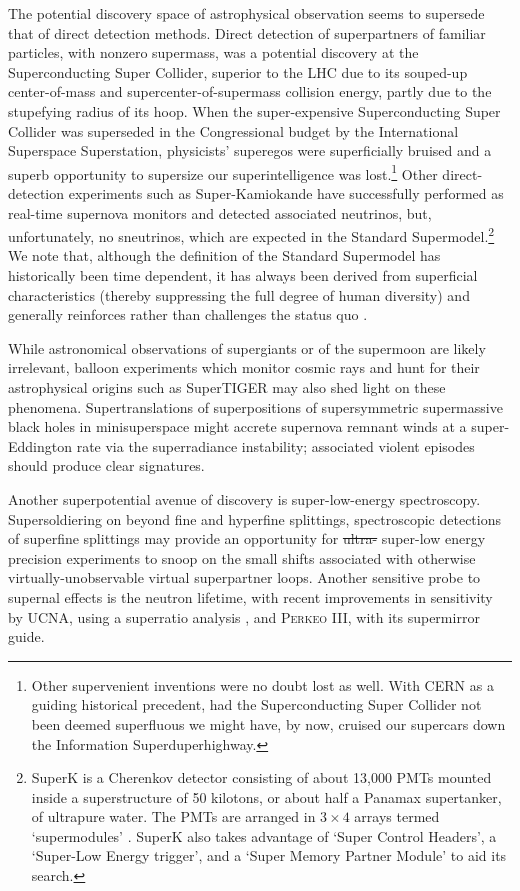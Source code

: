 The potential discovery space of astrophysical observation seems to supersede that of direct detection methods. 
Direct detection of superpartners of familiar particles, with nonzero supermass, was a potential discovery at the Superconducting Super Collider, superior to the LHC due to its souped-up center-of-mass and supercenter-of-supermass collision energy, partly due to the stupefying radius of its hoop.
When the super-expensive Superconducting Super Collider was superseded in the Congressional budget by the International Superspace Superstation, physicists' superegos were superficially bruised and a superb opportunity to supersize our superintelligence was lost.\footnote{Other supervenient inventions were no doubt lost as well.
With CERN as a guiding historical precedent, had the Superconducting Super Collider not been deemed superfluous we might have, by now, cruised our supercars down the Information Superduperhighway.}
Other direct-detection experiments such as Super-Kamiokande have successfully performed as real-time supernova monitors and detected associated neutrinos, but, unfortunately, no sneutrinos, which are expected in the Standard Supermodel.\footnote{SuperK is a Cherenkov detector consisting of about 13,000 PMTs mounted inside a superstructure of 50 kilotons, or about half a Panamax supertanker, of ultrapure water.  The PMTs are arranged in $3\times4$ arrays termed `supermodules' \cite{Fukuda:2002uc}.
SuperK also takes advantage of `Super Control Headers', a `Super-Low Energy trigger', and a `Super Memory Partner Module' to aid its search.
} We note that, although the definition of the Standard Supermodel has historically been time dependent, it has always been derived from superficial characteristics (thereby suppressing the full degree of human diversity) and generally reinforces rather than challenges the status quo \cite{fashionmodels}.


While astronomical observations of supergiants or of the supermoon are likely irrelevant, balloon experiments which monitor cosmic rays and hunt for their astrophysical origins such as SuperTIGER\cite{Binns:2014xpa} may also shed light on these phenomena.
Supertranslations of superpositions of supersymmetric supermassive black holes in minisuperspace might accrete supernova remnant winds at a super-Eddington rate via the superradiance instability; associated violent episodes should produce clear signatures.

Another superpotential avenue of discovery is super-low-energy spectroscopy.
Supersoldiering on beyond fine and hyperfine splittings, spectroscopic detections of superfine splittings may provide an opportunity for \st{ultra-} super-low energy precision experiments to snoop on the small shifts associated with otherwise virtually-unobservable virtual superpartner loops.
Another sensitive probe to supernal effects is the neutron lifetime, with recent improvements in sensitivity by UCNA, using a superratio analysis \cite{Brown:2017mhw}, and P\textsc{erkeo} III, with its supermirror guide\cite{Markisch:2018ndu}.

